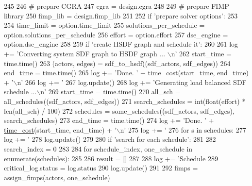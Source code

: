 \begin{DoxyCode}
{{{{{{{{245 
246     \textcolor{comment}{# prepare CGRA}
247     cgra = design.cgra
248 
249     \textcolor{comment}{# prepare FIMP library}
250     fimp\_lib = design.fimp\_lib
251 
252     \textcolor{keywordflow}{if} \textcolor{stringliteral}{'prepare solver options'}:
253 
254         time\_limit = option.time\_limit
255         solutions\_per\_schedule = option.solutions\_per\_schedule
256         effort = option.effort
257         dse\_engine = option.dse\_engine
258 
259     \textcolor{keywordflow}{if} \textcolor{stringliteral}{'create HSDF graph and schedule it'}:
260 
261         log += \textcolor{stringliteral}{'Converting system SDF graph to HSDF graph ... \(\backslash\)n'}
262         start\_time = time.time()
263         (actors, edges) = sdf\_to\_hsdf((sdf\_actors, sdf\_edges))
264         end\_time = time.time()
265         log += \textcolor{stringliteral}{'Done. '} + \hyperlink{namespacesylva_1_1dse_1_1dse_acf83688e18cc0859483b4c9bb70183fd}{time\_cost}(start\_time, end\_time) + \textcolor{stringliteral}{'\(\backslash\)n'}
266         log += \textcolor{stringliteral}{'%
267         log.update()
268         log += \textcolor{stringliteral}{'Generating load balanced SDF schedule ...\(\backslash\)n'}
269         start\_time = time.time()
270         all\_sch = all\_schedules((sdf\_actors, sdf\_edges))
271         search\_schedules = int(float(effort) * len(all\_sch) / 100)
272         schedules = some\_schedules((sdf\_actors, sdf\_edges), search\_schedules)
273         end\_time = time.time()
274         log += \textcolor{stringliteral}{'Done. '} + \hyperlink{namespacesylva_1_1dse_1_1dse_acf83688e18cc0859483b4c9bb70183fd}{time\_cost}(start\_time, end\_time) + \textcolor{stringliteral}{'\(\backslash\)n'}
275         log += \textcolor{stringliteral}{'%
276         \textcolor{keywordflow}{for} s \textcolor{keywordflow}{in} schedules:
277             log += \textcolor{stringliteral}{'%
278         log.update()
279 
280     \textcolor{keywordflow}{if} \textcolor{stringliteral}{'search for each schedule'}:
281 
282         search\_index = 0
283 
284         \textcolor{keywordflow}{for} schedule\_index, one\_schedule \textcolor{keywordflow}{in} enumerate(schedules):
285 
286             result = []
287 
288             log += \textcolor{stringliteral}{'Schedule %
289             critical\_log.status = log.status
290             log.update()
291 
292             fimps = assign\_fimps(actors, one\_schedule)
}}}}}}}}}}}}
\end{DoxyCode}
